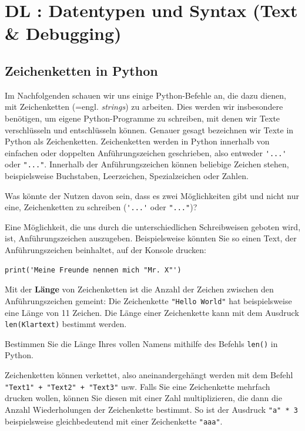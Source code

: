 \section{DL \themycounter: Datentypen und Syntax (Text \& Debugging)}

\subsection{Zeichenketten in Python}
Im Nachfolgenden schauen wir uns einige Python-Befehle an, die dazu dienen, mit Zeichenketten (=engl. \textit{strings}) zu arbeiten. Dies werden wir insbesondere benötigen, um eigene Python-Programme zu schreiben, mit denen wir Texte verschlüsseln und entschlüsseln können. Genauer gesagt bezeichnen wir Texte in Python als Zeichenketten. Zeichenketten werden in Python innerhalb von einfachen oder doppelten Anführungszeichen geschrieben, also entweder \lstinline|'...'| oder \lstinline|"..."|. Innerhalb der Anführungszeichen können beliebige Zeichen stehen, beispielsweise Buchstaben, Leerzeichen, Spezialzeichen oder Zahlen.

\begin{mychallenge}
Was könnte der Nutzen davon sein, dass es zwei Möglichkeiten gibt und nicht nur eine, Zeichenketten zu schreiben (\lstinline|'...'| oder \lstinline|"..."|)? 
\begin{myanswer}
Eine Möglichkeit, die uns durch die unterschiedlichen Schreibweisen geboten wird, ist, Anführungszeichen auszugeben. Beispielsweise könnten Sie so einen Text, der Anführungszeichen beinhaltet, auf der Konsole drucken:
\begin{lstlisting}
print('Meine Freunde nennen mich "Mr. X"')
\end{lstlisting}
\end{myanswer}
\end{mychallenge}

Mit der \textbf{Länge} von Zeichenketten ist die Anzahl der Zeichen zwischen den Anführungszeichen gemeint: Die Zeichenkette \lstinline|"Hello World"| hat beispielsweise eine Länge von 11 Zeichen. Die Länge einer Zeichenkette kann mit dem Ausdruck \lstinline|len(Klartext)| bestimmt werden.

\begin{myexercise}
Bestimmen Sie die Länge Ihres vollen Namens mithilfe des Befehls \lstinline|len()| in Python.
\end{myexercise}

Zeichenketten können verkettet, also aneinandergehängt werden mit dem Befehl \lstinline|"Text1" + "Text2" + "Text3"| usw. Falls Sie eine Zeichenkette mehrfach drucken wollen, können Sie diesen mit einer Zahl multiplizieren, die dann die Anzahl Wiederholungen der Zeichenkette bestimmt. So ist der Ausdruck \lstinline|"a" * 3| beispielsweise gleichbedeutend mit einer Zeichenkette \lstinline|"aaa"|.

